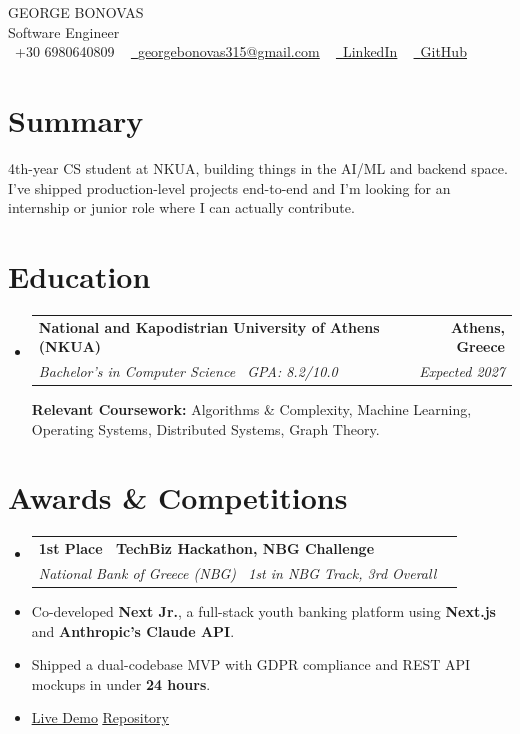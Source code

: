 \documentclass[letterpaper,11pt]{article}
\makeatletter
\newcommand{\resumeItem}[1]{
  \item\small{
    {#1 \vspace{-3pt}}
  }
}
\newcommand{\resumeSubheading}[4]{
  \vspace{-3pt}\item
    \begin{tabular*}{1.0\textwidth}[t]{l@{\extracolsep{\fill}}r}
      \textbf{#1} & \textbf{\small #2} \\
      \textit{\small#3} & \textit{\small #4} \\
    \end{tabular*}\vspace{-7pt}
}
\newcommand{\resumeSubHeadingListStart}{\begin{itemize}[leftmargin=0.0in, label={}]}
\newcommand{\resumeSubHeadingListEnd}{\end{itemize}}
\newcommand{\resumeItemListStart}{\begin{itemize}[leftmargin=0.15in]}
\newcommand{\resumeItemListEnd}{\end{itemize}\vspace{-5pt}}
\makeatother
\begin{document}
    \begin{center}
        {\Huge\scshape GEORGE BONOVAS} \\ \vspace{4pt}
        Software Engineer \\ \vspace{4pt}
        \small
        \raisebox{-0.2\height}\faPhone\ +30 6980640809 ~
        \href{mailto:georgebonovas315@gmail.com}{\raisebox{-0.2\height}\faEnvelope\ \underline{georgebonovas315@gmail.com}} ~
        \href{http://www.linkedin.com/in/george-bonovas}{\raisebox{-0.2\height}\faLinkedin\ \underline{LinkedIn}} ~
        \href{https://github.com/georgebon5}{\raisebox{-0.2\height}\faGithub\ \underline{GitHub}}
    \end{center}

\section{Summary}
\small{4th-year CS student at NKUA, building things in the AI/ML and backend space. I've shipped production-level projects end-to-end and I'm looking for an internship or junior role where I can actually contribute.}
\vspace{-2pt}

\section{Education}

  \resumeSubHeadingListStart
    \resumeSubheading
      {National and Kapodistrian University of Athens (NKUA)}{Athens, Greece}
      {Bachelor's in Computer Science \textemdash\ GPA: 8.2/10.0}{Expected 2027}

        \vspace{5pt}\small\textbf{Relevant Coursework:} Algorithms \& Complexity, Machine Learning, Operating Systems, Distributed Systems, Graph Theory.

  \resumeSubHeadingListEnd


\section{Awards \& Competitions}
  \resumeSubHeadingListStart
    \resumeSubheading
      {1st Place \textemdash\ TechBiz Hackathon, NBG Challenge}{}
      {National Bank of Greece (NBG) \textemdash\ 1st in NBG Track, 3rd Overall}{}
  \resumeSubHeadingListEnd
  \resumeItemListStart
    \resumeItem{Co-developed \textbf{Next Jr.}, a full-stack youth banking platform using \textbf{Next.js} and \textbf{Anthropic's Claude API}.}
    \resumeItem{Shipped a dual-codebase MVP with GDPR compliance and REST API mockups in under \textbf{24 hours}.}
    \resumeItem{\href{https://frontend-sand-pi-23.vercel.app}{\underline{Live Demo}} \quad \href{https://github.com/georgebon5/programming-projects}{\underline{Repository}}}
  \resumeItemListEnd
\end{document}
